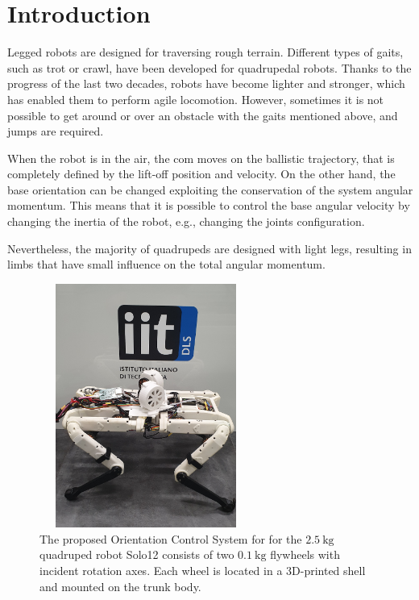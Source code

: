 \documentclass[sensors,article,submit,pdftex,moreauthors]{Definitions/mdpi}
\begin{document}
\section{Introduction}\label{sec:introduction}
Legged robots are designed for traversing rough terrain.
Different types of gaits, such as trot or crawl, have been developed for quadrupedal robots. 
Thanks to the progress of the last two decades, robots have become lighter and stronger, which has enabled them to perform agile locomotion.
However, sometimes it is not possible to get around or over an obstacle with the gaits mentioned above, and jumps are required. 

When the robot is in the air, the \gls{com} moves on the ballistic trajectory, that is completely defined by the lift-off position and velocity. On the other hand, the base orientation can be changed exploiting the conservation of the system angular momentum. This means that it is possible to control the base angular velocity by changing the inertia of the robot, e.g., changing the joints configuration. 

Nevertheless, the majority of quadrupeds are designed with light legs, resulting in limbs that have small influence on the total angular momentum.

\begin{figure}[t!]
	\centering
	\includegraphics[width=7cm,height=8cm,keepaspectratio]{figures/solo_fw_pic_compressed.png}
	\caption{\small The proposed Orientation Control System for 
		for the $2.5 \ \mathrm{kg}$ quadruped robot Solo12 consists of two $0.1 \ \mathrm{kg}$ flywheels with incident rotation axes. Each wheel is located in a 3D-printed shell and mounted on the trunk body.}
	\label{fig:solo12flywheels}
\end{figure} 
\end{document}
